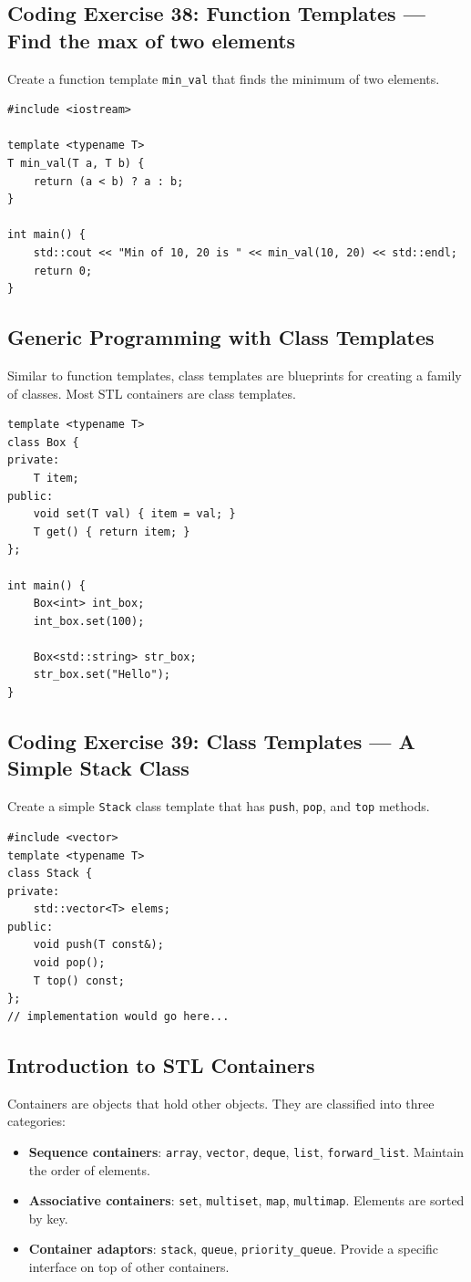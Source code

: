 \subsection{Coding Exercise 38: Function Templates --- Find the max of two elements}
Create a function template \texttt{min\_val} that finds the minimum of two elements.
\begin{lstlisting}
#include <iostream>

template <typename T>
T min_val(T a, T b) {
	return (a < b) ? a : b;
}

int main() {
	std::cout << "Min of 10, 20 is " << min_val(10, 20) << std::endl;
	return 0;
}
\end{lstlisting}

\subsection{Generic Programming with Class Templates}
Similar to function templates, class templates are blueprints for creating a family of classes. Most STL containers are class templates.
\begin{lstlisting}
template <typename T>
class Box {
private:
	T item;
public:
	void set(T val) { item = val; }
	T get() { return item; }
};

int main() {
	Box<int> int_box;
	int_box.set(100);

	Box<std::string> str_box;
	str_box.set("Hello");
}
\end{lstlisting}

\subsection{Coding Exercise 39: Class Templates --- A Simple Stack Class}
Create a simple \texttt{Stack} class template that has \texttt{push}, \texttt{pop}, and \texttt{top} methods.
\begin{lstlisting}
#include <vector>
template <typename T>
class Stack {
private:
	std::vector<T> elems;
public:
	void push(T const&);
	void pop();
	T top() const;
};
// implementation would go here...
\end{lstlisting}

\subsection{Introduction to STL Containers}
Containers are objects that hold other objects. They are classified into three categories:
\begin{itemize}
    \item \textbf{Sequence containers}: \texttt{array}, \texttt{vector}, \texttt{deque}, \texttt{list}, \texttt{forward\_list}. Maintain the order of elements.
    \item \textbf{Associative containers}: \texttt{set}, \texttt{multiset}, \texttt{map}, \texttt{multimap}. Elements are sorted by key.
    \item \textbf{Container adaptors}: \texttt{stack}, \texttt{queue}, \texttt{priority\_queue}. Provide a specific interface on top of other containers.
\end{itemize}

